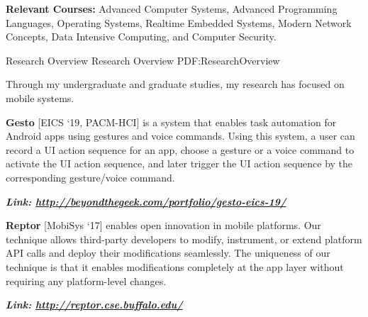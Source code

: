 \documentclass[letterpaper,MMMyyyy,nonstopmode]{simpleresumecv}
\begin{document}
\begin{Body}
\BigGap
\Entry
\textbf{Relevant Courses:} Advanced Computer Systems, Advanced Programming Languages, Operating Systems, 
Realtime Embedded Systems, Modern Network Concepts, Data Intensive Computing,  and Computer Security.


\Section
{Research Overview}
{Research Overview}
{PDF:ResearchOverview}



\Entry
Through my undergraduate and graduate studies, my research has focused on mobile systems.

\Gap
\BulletItem
\textbf{Gesto} [EICS `19, PACM-HCI] is a system that enables task automation for Android apps using gestures 
and voice commands. Using this system, a user can record a UI action sequence for an app, 
choose a gesture or a voice command to activate the UI action sequence, and later trigger 
the UI action sequence by the corresponding gesture/voice command.

\hspace{2ex}
\textbf{\textit{Link: \href{http://beyondthegeek.com/portfolio/gesto-eics-19/}
{http://beyondthegeek.com/portfolio/gesto-eics-19/}}}
\hfill

\Gap
\BulletItem
\textbf{Reptor} [MobiSys `17] enables open innovation in mobile platforms. Our technique allows third-party 
developers to modify, instrument, or extend platform API calls and deploy their modifications 
seamlessly. The uniqueness of our technique is that it enables modifications completely at 
the app layer without requiring any platform-level changes. 

\hspace{2ex}
\textbf{\textit{Link: \href{http://reptor.cse.buffalo.edu/}{http://reptor.cse.buffalo.edu/}}}
\hfill


\end{Body}
\end{document}
